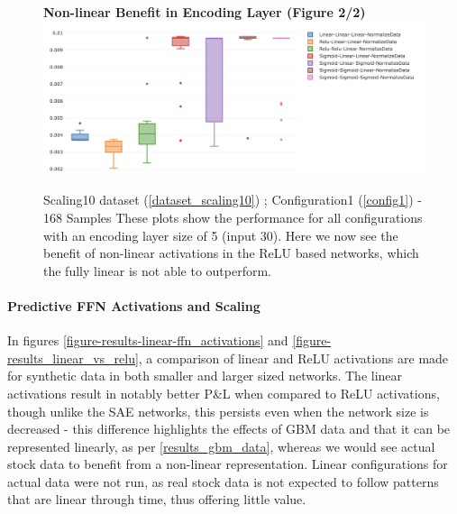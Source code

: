 \documentclass[a4paper,11pt,oneside]{article}
\theoremstyle{plain}
\theoremstyle{definition}
\begin{document}
\begin{figure}[H]
	\centering 
	\textbf{Non-linear Benefit in Encoding Layer (Figure 2/2)}
	\includegraphics[scale=0.4]{images/results/linearity/4Encoding_5_Activation_Combos_Min_MSE.png}
	\caption{Scaling10 dataset (\ref{dataset_scaling10}) ; Configuration1 (\ref{config1}) - 168 Samples
		\newline \newline These plots show the performance for all configurations with an encoding layer size of 5 (input 30). Here we now see the benefit of non-linear activations in the ReLU based networks, which the fully linear is not able to outperform.}
	\label{figure-results-encoding5}
\end{figure}

\paragraph{Predictive FFN Activations and Scaling}

In figures \ref{figure-results-linear-ffn_activations} and \ref{figure-results_linear_vs_relu}, a comparison of linear and ReLU activations are made for synthetic data in both smaller and larger sized networks. The linear activations result in notably better P\&L when compared to ReLU activations, though unlike the SAE networks, this persists even when the network size is decreased - this difference highlights the effects of GBM data and that it can be represented linearly, as per \ref{results_gbm_data}, whereas we would see actual stock data to benefit from a non-linear representation. Linear configurations for actual data were not run, as real stock data is not expected to follow patterns that are linear through time, thus offering little value. \newline
\end{document}
